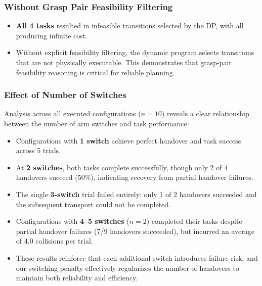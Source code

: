 \subsubsection{Without Grasp Pair Feasibility Filtering}

\begin{itemize}
\item \textbf{All 4 tasks} resulted in infeasible transitions selected by the DP, with all producing infinite cost.
\item Without explicit feasibility filtering, the dynamic program selects transitions that are not physically executable. This demonstrates that grasp-pair feasibility reasoning is critical for reliable planning.
\end{itemize}

\subsubsection{Effect of Number of Switches}

Analysis across all executed configurations ($n=10$) reveals a clear relationship between the number of arm switches and task performance:
\begin{itemize}
\item Configurations with \textbf{1 switch} achieve perfect handover and task success across 5 trials.
\item At \textbf{2 switches}, both tasks complete successfully, though only 2 of 4 handovers succeed (50\%), indicating recovery from partial handover failures.
\item The single \textbf{3-switch} trial failed entirely: only 1 of 2 handovers succeeded and the subsequent transport could not be completed.
\item Configurations with \textbf{4--5 switches} ($n=2$) completed their tasks despite partial handover failures (7/9 handovers succeeded), but incurred an average of 4.0 collisions per trial.
\item These results reinforce that each additional switch introduces failure risk, and our switching penalty effectively regularizes the number of handovers to maintain both reliability and efficiency.
\end{itemize}
